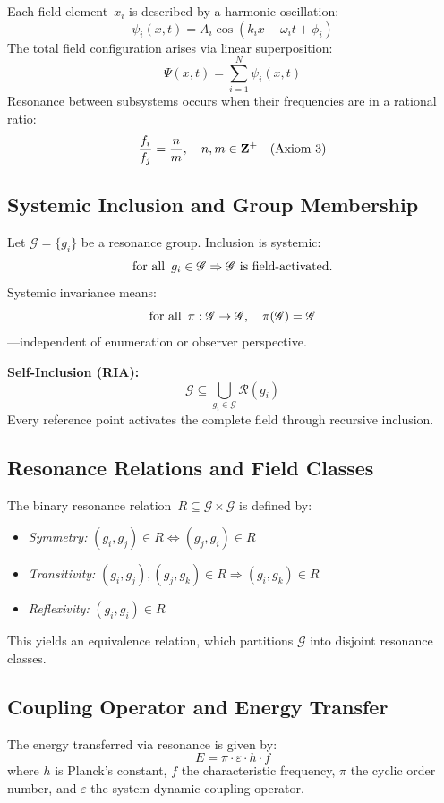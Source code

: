 \documentclass[12pt]{iopart}
\providecommand{\mathbb}[1]{\mathbf{#1}}
\providecommand{\mathcal}[1]{\mathscr{#1}}
\providecommand{\text}[1]{\mbox{#1}}
\providecommand{\forall}{\hbox{for all }}
\providecommand{\quad}{\hskip1em\relax}
\begin{document}
Each field element~$x_i$ is described by a harmonic oscillation:
\[
\psi_i(x, t) = A_i \cos(k_i x - \omega_i t + \phi_i)
\]
The total field configuration arises via linear superposition:
\[
\Psi(x, t) = \sum_{i=1}^N \psi_i(x, t)
\]
Resonance between subsystems occurs when their frequencies are in a rational ratio:
\[
\frac{f_i}{f_j} = \frac{n}{m}, \quad n, m \in \mathbb{Z}^+ \quad \text{(Axiom 3)}
\]

\subsection{Systemic Inclusion and Group Membership}

Let $\mathcal{G} = \{g_i\}$ be a resonance group. Inclusion is systemic:
\[
\forall\, g_i \in \mathcal{G} \Rightarrow \mathcal{G} \text{ is field-activated.}
\]
Systemic invariance means:
\[
\forall\, \pi : \mathcal{G} \to \mathcal{G},\quad \pi(\mathcal{G}) = \mathcal{G}
\]
—independent of enumeration or observer perspective.

\textbf{Self-Inclusion (RIA):}
\[
\mathcal{G} \subseteq \bigcup_{g_i \in \mathcal{G}} \mathcal{R}(g_i)
\]
Every reference point activates the complete field through recursive inclusion.

\subsection{Resonance Relations and Field Classes}

The binary resonance relation~$R \subseteq \mathcal{G} \times \mathcal{G}$ is defined by:
\begin{itemize}
	\item \textit{Symmetry:} $(g_i, g_j) \in R \Leftrightarrow (g_j, g_i) \in R$
	\item \textit{Transitivity:} $(g_i, g_j), (g_j, g_k) \in R \Rightarrow (g_i, g_k) \in R$
	\item \textit{Reflexivity:} $(g_i, g_i) \in R$
\end{itemize}
This yields an equivalence relation, which partitions $\mathcal{G}$ into disjoint resonance classes.

\subsection{Coupling Operator and Energy Transfer}

The energy transferred via resonance is given by:
\[
E = \pi \cdot \varepsilon \cdot h \cdot f
\]
where $h$ is Planck’s constant, $f$ the characteristic frequency, $\pi$ the cyclic order number, and $\varepsilon$ the system-dynamic coupling operator.
\end{document}
